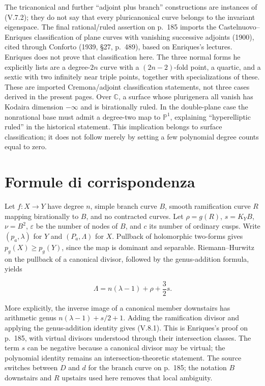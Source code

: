 The tricanonical and further ``adjoint plus branch'' constructions are instances of (V.7.2); they do not say that every pluricanonical curve belongs to the invariant eigenspace. The final rational/ruled assertion on p.~185 imports the Castelnuovo--Enriques classification of plane curves with vanishing successive adjoints (1900), cited through Conforto (1939, §27, p.~489), based on Enriques's lectures. Enriques does not prove that classification here. The three normal forms he explicitly lists are a degree-\(2n\) curve with a \((2n-2)\)-fold point, a quartic, and a sextic with two infinitely near triple points, together with specializations of these. These are imported Cremona/adjoint classification statements, not three cases derived in the present pages. Over \(\mathbb C\), a surface whose plurigenera all vanish has Kodaira dimension \(-\infty\) and is birationally ruled. In the double-plane case the nonrational base must admit a degree-two map to \(\mathbb P^1\), explaining ``hyperelliptic ruled'' in the historical statement. This implication belongs to surface classification; it does not follow merely by setting a few polynomial degree counts equal to zero.

\section{Formule di corrispondenza}
\label{cp1-v-8}

Let \(f:X\to Y\) have degree \(n\), simple branch curve \(B\), smooth ramification curve \(R\) mapping birationally to \(B\), and no contracted curves. Let \(\rho=g(R)\), \(s=K_YB\), \(\nu=B^2\), \(\varepsilon\) be the number of nodes of \(B\), and \(c\) its number of ordinary cusps. Write \((p_a,\lambda)\) for \(Y\) and \((P_a,\Lambda)\) for \(X\). Pullback of holomorphic two-forms gives \(p_g(X)\ge p_g(Y)\), since the map is dominant and separable. Riemann--Hurwitz on the pullback of a canonical divisor, followed by the genus-addition formula, yields

\[
\Lambda=n(\lambda-1)+\rho+\frac32s. \tag{V.8.1}
\]

More explicitly, the inverse image of a canonical member downstairs has arithmetic genus \(n(\lambda-1)+s/2+1\). Adding the ramification divisor and applying the genus-addition identity gives (V.8.1). This is Enriques's proof on p.~185, with virtual divisors understood through their intersection classes. The term \(s\) can be negative because a canonical divisor may be virtual; the polynomial identity remains an intersection-theoretic statement. The source switches between \(D\) and \(d\) for the branch curve on p.~185; the notation \(B\) downstairs and \(R\) upstairs used here removes that local ambiguity.

